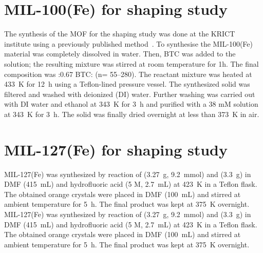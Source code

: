 \section{MIL-100(Fe) for shaping study}%
\label{appx:synthesis:mil100shaping}

The synthesis of the \gls{MOF} for the shaping study was 
done at the KRICT institute using a previously
published method~\cite{jeremiasAmbientPressureSynthesis2016}.
To synthesise the MIL-100(Fe) material 
 was completely dissolved in water.
Then, \gls{BTC} was added to the
solution; the resulting mixture was stirred at room temperature 
for 1h. The final composition was :0.67 
\gls{BTC}: (n= 55–280). The reactant mixture was
heated at \SI{433}{\kelvin} for
\SI{12}{\hour} using a Teflon-lined pressure vessel. The synthesized 
solid was filtered and washed with deionized (DI) water.
Further washing was carried out with DI water and ethanol at
\SI{343}{\kelvin} for \SI{3}{\hour} and purified with a 
38 mM  solution at \SI{343}{\kelvin} for \SI{3}{\hour}. 
The solid was finally dried overnight at less than 
\SI{373}{\kelvin} in air.

\section{MIL-127(Fe) for shaping study}%
\label{appx:synthesis:mil127shaping}

MIL-127(Fe) was synthesized by reaction of
 (\SI{3.27}{\gram}, \SI{9.2}{\milli\mol}) and 
 (\SI{3.3}{\gram}) in \gls{DMF} (\SI{415}{\milli\liter}) 
and hydrofluoric acid (5 M, \SI{2.7}{\milli\liter}) at 
\SI{423}{\kelvin} in a Teflon
flask. The obtained orange crystals were placed in 
\gls{DMF} (\SI{100}{\milli\liter}) and stirred at ambient temperature for 
\SI{5}{\hour}. The final product was kept at 
\SI{375}{\kelvin} overnight. MIL-127(Fe) was synthesized by reaction of
 (\SI{3.27}{\gram}, \SI{9.2}{\milli\mol}) and 
 (\SI{3.3}{\gram}) in \gls{DMF}
(\SI{415}{\milli\liter}) and hydrofluoric acid (5 M, 
\SI{2.7}{\milli\liter}) at \SI{423}{\kelvin} in a Teflon 
flask. The obtained orange crystals were placed in \gls{DMF} 
(\SI{100}{\milli\liter}) and stirred at ambient temperature 
for \SI{5}{\hour}. The final product was
kept at \SI{375}{\kelvin} overnight.


